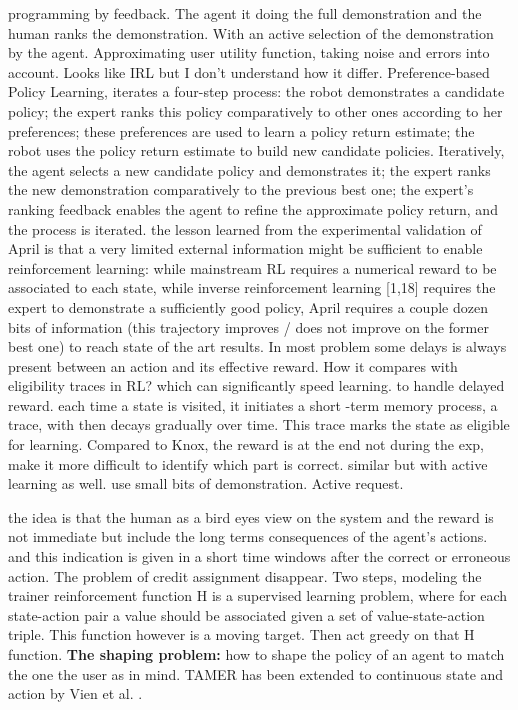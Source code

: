 \cite{akrour2014programming} programming by feedback. The agent it doing the full demonstration and the human ranks the demonstration. With an active selection of the demonstration by the agent. Approximating user utility function, taking noise and errors into account. Looks like IRL but I don't understand how it differ.
\cite{akrour2011preference} Preference-based Policy Learning, iterates a four-step process: the robot demonstrates a candidate policy; the expert ranks this policy comparatively to other ones according to her preferences; these preferences are used to learn a policy return estimate; the robot uses the policy return estimate to build new candidate policies.
\cite{akrour2012april} Iteratively, the agent selects a new candidate policy and demonstrates it; the expert ranks the new demonstration comparatively to the previous best one; the expert's ranking feedback enables the agent to refine the approximate policy return, and the process is iterated. the lesson learned from the experimental validation of April is that a very
limited external information might be sufficient to enable reinforcement learning: while mainstream RL requires a numerical reward to be associated to each state, while inverse reinforcement learning [1,18] requires the expert to demonstrate a sufficiently good policy, April requires a couple dozen bits of information (this trajectory improves / does not improve on the former best one) to reach state of the art results. In most problem some delays is always present between an action and its effective reward. How it compares with eligibility traces \cite{sutton1998reinforcement} in RL? which can significantly speed learning. to handle delayed reward. each time a state is visited, it initiates a short -term memory process, a trace, with then decays gradually over time. This trace marks the state as eligible for learning. Compared to Knox, the reward is at the end not during the exp, make it more difficult to identify which part is correct. \cite{wilson2012bayesian} similar but with active learning as well. use small bits of demonstration. Active request.


\cite{knox2009interactively} the idea is that the human as a bird eyes view on the system and the reward is not immediate but include the long terms consequences of the agent's actions. and this indication is given in a short time windows after the correct or erroneous action. The problem of credit assignment disappear.
Two steps, modeling the trainer reinforcement function H is a supervised learning problem, where for each state-action pair a value should be associated given a set of value-state-action triple. This function however is a moving target. Then act greedy on that H function.
\textbf{The shaping problem:} how to shape the policy of an agent to match the one the user as in mind. TAMER has been extended to continuous state and action by Vien et al. \cite{vien2013learning}.


